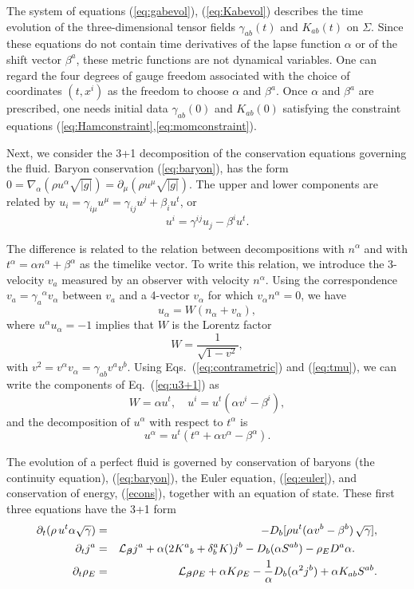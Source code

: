 \documentclass[12pt]{article}
\def\a{\alpha}
\def\b{\beta}
\def\g{\gamma}
\def\Lie{{\cal L}}
\def\be{\begin{equation}}
\def\ee{\end{equation}}
\newcommand{\pa}{\partial}
\newcommand{\na}{\nabla}
\def\a{\alpha}
\def\b{\beta}
\def\bea{\begin{eqnarray}}
\def\eea{\end{eqnarray}}
\begin{document}
{The system of equations (\ref{eq:gabevol}), (\ref{eq:Kabevol}) describes the time 
evolution of the three-dimensional tensor fields $\g_{ab}(t)$ 
and $K_{ab}(t)$ on $\Sigma$.  Since these equations
do not contain time derivatives of
the lapse function $\alpha$ or of the shift vector $\beta^a$, these 
metric functions are not dynamical variables. One can regard the four degrees 
of gauge freedom associated with the choice of coordinates $(t, x^i)$ as 
the freedom to choose $\alpha$ and $\beta^a$.  Once $\alpha$ and $\beta^a$ are prescribed, one needs initial data  $\gamma_{ab}(0)$ and $K_{ab}(0)$  satisfying
the constraint equations (\ref{eq:Hamconstraint},\ref{eq:momconstraint}).

Next, we consider the 3+1 decomposition of the conservation equations governing the fluid. Baryon conservation (\ref{eq:baryon}), has the form 
$0 = \na_\a(\rho u^\a\sqrt{|g|}) = \partial_\mu(\rho u^\mu\sqrt{|g|})$.
The upper and lower components are related by 
$u_i = \gamma_{i\mu} u^\mu = \gamma_{ij}u^j + \beta_i u^t$, 
or 
\be
   u^i = \gamma^{ij}u_j -\beta^i u^t.    
\ee

The difference is related to the relation between decompositions with 
$n^\a$ and with $t^\a= \a n^\a + \b^\a$ as the timelike vector.  To write this relation, 
we introduce the 3-velocity $v_a$ measured by an observer with velocity $n^\alpha$.    
Using the correspondence $v_a=\gamma_a{}^\a v_\a$ between $v_a$ and a 4-vector 
$v_\a$ for which $v_\a n^\a=0$, we have    
\be
   u_\alpha = W (n_\alpha + v_\alpha),  
\label{eq:u3+1}\ee
where $u^\a u_\a = -1$ implies that $W$ is the Lorentz factor  
\be
   W = \frac1{\sqrt{1-v^2}}, 
\label{eq:ww}\ee
with $v^2 = v^\a v_\a = \gamma_{ab}v^a v^b$.  
Using Eqs.~(\ref{eq:contrametric}) and (\ref{eq:tmu}), we can write the components of Eq.~(\ref{eq:u3+1}) 
as 
\be
    W = \alpha u^t, \quad 
        u^i = u^t\left(\a v^i -\b^i\right), 
\label{eq:wv}\ee 
and the decomposition of $u^\a$ with respect to $t^\a$ is 
\be
u^\a = u^t(t^\a + \a v^\a -\beta^\a).
\ee


The evolution of a perfect fluid is governed by conservation of baryons (the continuity equation), (\ref{eq:baryon}), the Euler equation, (\ref{eq:euler}), and conservation of energy, (\ref{econs}), together with an equation of state.  These first three equations have the 3+1 form 
\bea
  \pa_t(\rho\, u^t\alpha \sqrt{\gamma}) 
                &=& -  D_b [\rho u^t(\a v^b-\b^b)\,\sqrt{\gamma}],
\label{eq:bcons3+1}\\
  \pa_t j^a &=& \Lie_{\bm\beta} j^a +\a(2K^a{}_b+\delta^a_b K) j^b 
                - D_b(\alpha S^{ab}) -\rho_E D^a \alpha.\qquad
\label{eq:euler3+1}\\
 \pa_t \rho_E &=& \Lie_{\bm\beta} \rho_E +\alpha K\rho_E -\frac1\alpha D_b(\alpha^2 j^b) +\alpha K_{ab}S^{ab}.
\label{eq:econs3+1}
\index{perfect fluid!evolution equations}\index{Euler equation!relativistic}\eea  
{}

}
\end{document}
